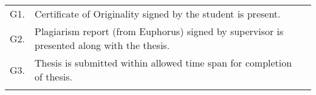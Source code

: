 \begin{table}[!ht]
\begin{adjustbox}{width=\linewidth,center}
\begin{tabular}{p{0.6cm}p{9cm}p{0.6cm}}
G1.            & Certificate of Originality signed by   the student is present.                                                  &  \\
G2.            & Plagiarism   report (from Euphorus) signed by supervisor is presented along with the   thesis.                  &  \\
G3.            & Thesis is submitted   within allowed time span for completion of thesis.                                        &  \\
               &                                                                                                                 &  \\
\end{tabular}
\end{adjustbox}
\end{table}

